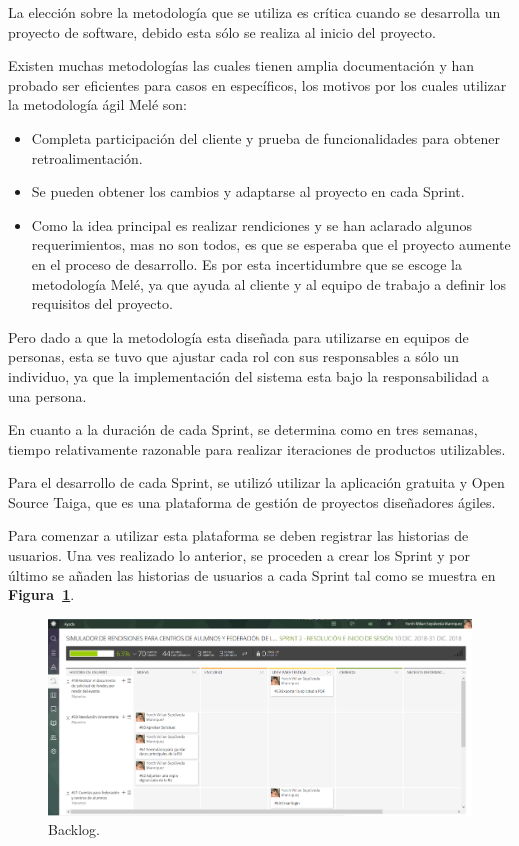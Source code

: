 La elección sobre la metodología que se utiliza es crítica cuando se desarrolla un proyecto de software, debido esta sólo se realiza al inicio del proyecto. 

Existen muchas metodologías las cuales tienen amplia documentación y han probado ser eficientes para casos en específicos, los motivos por los cuales utilizar la metodología ágil Melé son:

\begin{itemize}
	\item Completa participación del cliente y prueba de funcionalidades para obtener retroalimentación.

	\item Se pueden obtener los cambios y adaptarse al proyecto en cada Sprint.

	\item Como la idea principal es realizar rendiciones y se han aclarado algunos requerimientos, mas no son todos, es que se esperaba que el proyecto aumente en el proceso de desarrollo. Es por esta incertidumbre que se escoge la metodología Melé, ya que ayuda al cliente y al equipo de trabajo a definir los requisitos del proyecto.
\end{itemize}

Pero dado a que la metodología esta diseñada para utilizarse en equipos de personas, esta se tuvo que ajustar cada rol con sus responsables a sólo un individuo, ya que la implementación del sistema esta bajo la responsabilidad a una persona.

En cuanto a la duración de cada Sprint, se determina como en tres semanas, tiempo relativamente razonable para realizar iteraciones de productos utilizables.

Para el desarrollo de cada Sprint, se utilizó utilizar la aplicación gratuita y Open Source Taiga, que es una plataforma de gestión de proyectos diseñadores ágiles.

Para comenzar a utilizar esta plataforma se deben registrar las historias de usuarios. Una ves realizado lo anterior, se proceden a crear los Sprint y por último se añaden las historias de usuarios a cada Sprint tal como se muestra en \textbf{Figura~\ref{fig: backlog}}.

\begin{figure}[h!]
	\includegraphics[width=\textwidth]{Imagenes/Kanban.png}
	\caption{\label{fig: backlog} Backlog.}
\end{figure}

